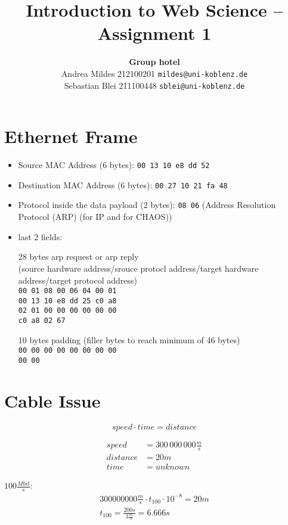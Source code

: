 \documentclass{article}
\title{Introduction to Web Science -- Assignment 1}
\author{\textbf{Group hotel}\\Andrea Mildes 212100201 \texttt{mildes@uni-koblenz.de}\\Sebastian Blei 211100448 \texttt{sblei@uni-koblenz.de}}
\date{}
\begin{document}
\maketitle

\section{Ethernet Frame}

\begin{itemize}
 \item Source MAC Address (6 bytes): \texttt{00 13 10 e8 dd 52}
 \item Destination MAC Address (6 bytes): \texttt{00 27 10 21 fa 48}
 \item Protocol inside the data payload (2 bytes): \texttt{08 06} (Address Resolution Protocol (ARP) (for IP and for CHAOS))
 \item last 2 fields:
 
 28 bytes arp request or arp reply\\
 (source hardware address/srouce protocl address/target hardware address/target protocol address)\\
 \texttt{00 01 08 00 06 04 00 01\\
 00 13 10 e8 dd 25 c0 a8\\
 02 01 00 00 00 00 00 00\\
 c0 a8 02 67}
 
 10 bytes padding (filler bytes to reach minimum of 46 bytes)\\
 \texttt{00 00 00 00 00 00 00 00\\
 00 00}
\end{itemize}

\clearpage
\section{Cable Issue}

\begin{equation}
 speed \cdot time = distance
\end{equation}

\begin{align}
 speed &= 300\,000\,000\frac{m}{s} \\
 distance &= 20m\\
 time &= unknown
\end{align}

$100\frac{Mbit}{s}$:
\begin{align}
 300 000 000\frac{m}{s} \cdot t_{100} \cdot 10^{-8} = 20m\\
 t_{100} = \frac{200s}{3\frac{m}{s}} = 6.666s
\end{align}
\end{document}

